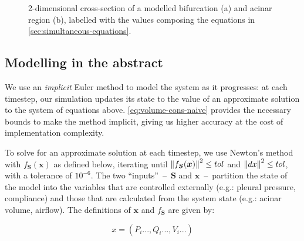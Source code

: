 \begin{figure}[t]
    \centering
    \begin{subfigure}[t]{.7\textwidth}
        \begin{tikzpicture}
            
        \end{tikzpicture}
    \end{subfigure}
    \par\bigskip
    \begin{subfigure}[t]{.4\textwidth}
        \begin{tikzpicture}[scale=.75]
            
        \end{tikzpicture}
    \end{subfigure}
    \caption{
        2-dimensional cross-section of a modelled bifurcation (a) and acinar region (b), labelled
        with the values composing the equations in \autoref{sec:simultaneous-equations}.
    }
\end{figure}

\subsection{Modelling in the abstract} \label{sec:modelling-in-the-abstract}

We use an \textit{implicit} Euler method to model the system as it progresses: at each timestep, our
simulation updates its state to the value of an approximate solution to the system of equations
above. \autoref{eq:volume-cons-naive} provides the necessary bounds to make the method implicit,
giving us higher accuracy at the cost of implementation complexity.

To solve for an approximate solution at each timestep, we use Newton's method with $f_{\bm{S}}(\bm{x})$ as
defined below, iterating until $\norm{f_{\bm{S}}(\bm{x})}^2 \le tol$ and $\norm{dx}^2 \le tol$, with
a tolerance of $10^{-6}$. The two ``inputs''~--~$\bm{S}$ and $\bm{x}$~--~partition the state of the
model into the variables that are controlled externally (e.g.: pleural pressure, compliance) and
those that are calculated from the system state (e.g.: acinar volume, airflow). The definitions of
$\bm{x}$ and $f_{\bm{S}}$ are given by:

\begin{equation*}
    x = (P_i..., Q_i..., V_i...)
\end{equation*}

